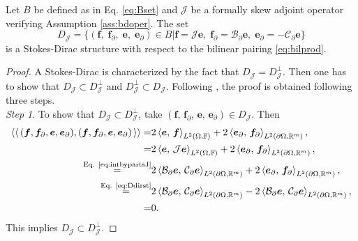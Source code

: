 \begin{proposition}\label{prop:stdir}
Let $B$ be defined as in Eq. \eqref{eq:Bset} and $\mathcal{J}$ be a formally skew adjoint operator verifying Assumption \ref{ass:bdoper}. The set
\begin{equation}\label{eq:Ddirst}
D_{\mathcal{J}} = \{(\bm{f}, \; \bm{f}_\partial, \; \bm{e}, \; \bm{e}_\partial) \in B\vert \bm{f} = \mathcal{J} \bm{e}, \; \bm{f}_\partial = \mathcal{B}_\partial \bm{e}, \; \bm{e}_\partial = -\mathcal{C}_\partial \bm{e}\} 
\end{equation}
is a Stokes-Dirac structure with respect to the bilinear pairing \eqref{eq:bilprod}.
\begin{proof}
A Stokes-Dirac is characterized by the fact that ${D}_{\mathcal{J}} = {D}_{\mathcal{J}}^\perp$. Then one has to show that ${D}_{\mathcal{J}} \subset {D}_{\mathcal{J}}^\perp$ and ${D}_{\mathcal{J}}^\perp \subset {D}_{\mathcal{J}}$. Following \cite{legorrec2005}, the proof is obtained following three steps. \\

\textit{Step 1}. To show that ${D}_{\mathcal{J}} \subset {D}_{\mathcal{J}}^\perp$, take $(\bm{f}, \, \bm{f}_\partial, \, \bm{e}, \, \bm{e}_\partial) \in {D}_{\mathcal{J}}$. Then
\begin{align*}
\bilprod{(\bm{f}, \bm{f}_{\partial}, \bm{e}, \bm{e}_{\partial})}{(\bm{f}, \bm{f}_{\partial}, \bm{e}, \bm{e}_{\partial})} =& 2 \inner[L^2(\Omega, \bbF)]{\bm{e}}{\bm{f}} + 2 \inner[L^2(\partial\Omega, \bbR^m)]{\bm{e}_{\partial}}{\bm{f}_{\partial}}, \\
=& 2 \inner[L^2(\Omega, \bbF)]{\bm{e}}{\mathcal{J}\bm{e}} + 2 \inner[L^2(\partial\Omega, \bbR^m)]{\bm{e}_{\partial}}{\bm{f}_{\partial}}, \\
\stackrel{\text{Eq. \eqref{eq:intbypartsJ}}}{=}& 2 \inner[L^2(\partial\Omega, \bbR^m)]{\mathcal{B}_\partial \bm{e}}{\mathcal{C}_\partial \bm{e}} + 2 \inner[L^2(\partial\Omega, \bbR^m)]{\bm{e}_{\partial}}{\bm{f}_{\partial}}, \\
\stackrel{\text{Eq. \eqref{eq:Ddirst}}}{=}&  2 \inner[L^2(\partial\Omega, \bbR^m)]{\mathcal{B}_\partial \bm{e}}{\mathcal{C}_\partial \bm{e}} - 2 \inner[L^2(\partial\Omega, \bbR^m)]{\mathcal{B}_\partial \bm{e}}{\mathcal{C}_\partial \bm{e}}, \\
=& 0.
\end{align*}
This implies ${D}_{\mathcal{J}} \subset {D}_{\mathcal{J}}^\perp$.


\end{proof}
\end{proposition}
